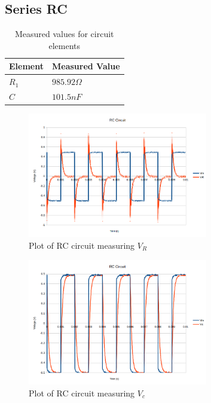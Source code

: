 \documentclass[10pt]{article}
\begin{document}
\subsection*{Series RC}
\begin{table}[H]
	\centering
	\begin{tabular}{ll}
		\hline
		\textbf{Element} & \textbf{Measured Value}\\
		\hline
		$R_1$ & $985.92 \Omega$\\
		$C$ & $101.5nF$\\
		\hline
	\end{tabular}
	\caption{Measured values for circuit elements}
\end{table}
\begin{figure}[H]
	\centering
	\includegraphics[width=0.7\textwidth]{RC_R.png}
	\caption{Plot of RC circuit measuring $V_R$}
\end{figure}
\begin{figure}[H]
	\centering
	\includegraphics[width=0.7\textwidth]{RC_C.png}
	\caption{Plot of RC circuit measuring $V_c$}
\end{figure}
\end{document}
